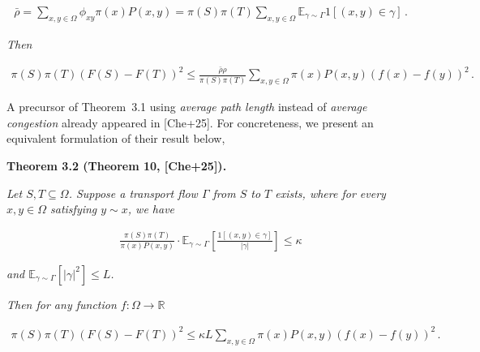 \documentclass[10pt,a4paper]{article}
\begin{document}
\[\begin{gathered}
\bar{\rho}=\sum_{x,y\in\Omega}\phi_{xy}\pi(x)P(x,y)=\pi(S)\pi(T)\sum_{x,y\in\Omega}\mathbb{E}_{\gamma\sim\Gamma}1[(x,y)\in\gamma]\,.
\end{gathered}\]




\emph{Then}\par


\[\begin{gathered}
\pi(S)\pi(T)(F(S)-F(T))^{2}\leq\frac{\bar{\rho}\rho}{\pi(S)\pi(T)}\sum_{x,y\in\Omega}\pi(x)P(x,y)(f(x)-f(y))^{2}\,.
\end{gathered}\]






A precursor of Theorem 3.1 using \emph{average path length} instead of \emph{average congestion} already appeared in [Che+25]. For concreteness, we present an equivalent formulation of their result below,\par





\par\medskip\noindent\textbf{\textbf{Theorem 3.2}\textbf{ }(Theorem 10, [Che+25])\textbf{.}}\par



\emph{Let $S,T\subseteq\Omega$. Suppose a transport flow $\Gamma$ from $S$ to $T$ exists, where for every $x,y\in\Omega$ satisfying $y\sim x$, we have}\par


\[\begin{gathered}
\frac{\pi(S)\pi(T)}{\pi(x)P(x,y)}\cdot\mathbb{E}_{\gamma\sim\Gamma}\left[\frac{1[(x,y)\in\gamma]}{|\gamma|}\right]\leq\kappa
\end{gathered}\]


\emph{and $\mathbb{E}_{\gamma\sim\Gamma}\left[|\gamma|^{2}\right]\leq L$.}\par




\emph{Then for any function $f:\Omega\rightarrow\mathbb{R}$}\par


\[\begin{gathered}
\pi(S)\pi(T)(F(S)-F(T))^{2}\leq\kappa L\sum_{x,y\in\Omega}\pi(x)P(x,y)(f(x)-f(y))^{2}\,.
\end{gathered}\]
\end{document}
